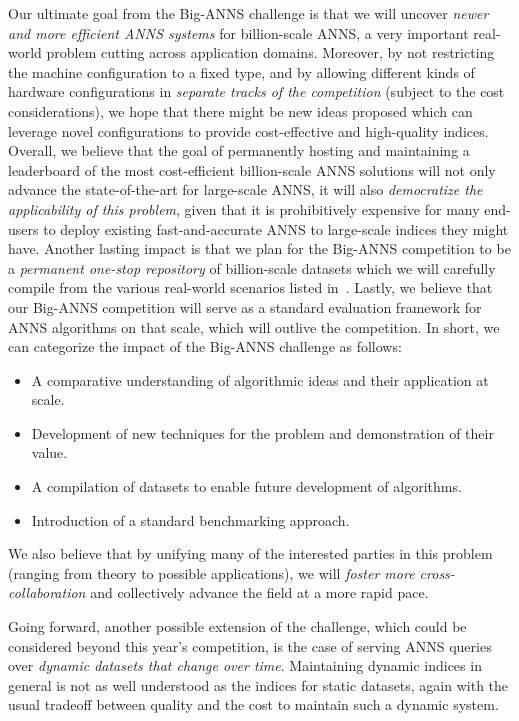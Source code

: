 Our ultimate goal from the Big-ANNS challenge is that we will uncover
\emph{newer and more efficient ANNS systems} for billion-scale ANNS, a
very important real-world problem cutting across application
domains. Moreover, by not restricting the machine configuration to a
fixed type, and by allowing different kinds of hardware configurations in \emph{separate tracks of the competition}
(subject to the cost considerations), we hope that there might be new
ideas proposed which can leverage novel configurations to provide
cost-effective and high-quality indices. 
Overall, we believe that the goal of permanently hosting and maintaining a leaderboard of the most cost-efficient billion-scale ANNS solutions  will not only advance the state-of-the-art for large-scale ANNS, it will also
\emph{democratize the applicability of this problem}, given that it is
prohibitively expensive for many end-users to deploy existing
fast-and-accurate ANNS to large-scale indices they might have.
Another lasting impact is that we plan for the Big-ANNS
competition to be a \emph{permanent one-stop repository} of
billion-scale datasets which we will carefully compile from the various
real-world scenarios listed in~. 
Lastly, we believe that our Big-ANNS competition will serve as a standard evaluation framework for 
ANNS algorithms on that scale, which will outlive the competition.
In short, we can categorize the
impact of the Big-ANNS challenge as follows:

\begin{itemize}
	\item A comparative understanding of algorithmic ideas and their
	application at scale.
	\item Development of new techniques for the problem and demonstration
	of their value.
	\item A compilation of datasets to enable future development of algorithms.
  \item Introduction of a standard benchmarking approach.
\end{itemize}

We also believe that by unifying many of the interested parties in
this problem (ranging from theory to possible applications), we will
\emph{foster more cross-collaboration} and collectively advance the
field at a more rapid pace.  

Going forward, another possible extension
of the challenge, which could be considered beyond this year's
competition, is the case of serving ANNS queries over \emph{dynamic
  datasets that change over time}. Maintaining dynamic indices in
general is not as well understood as the indices for static datasets,
again with the usual tradeoff between quality and the cost to maintain
such a dynamic system.


